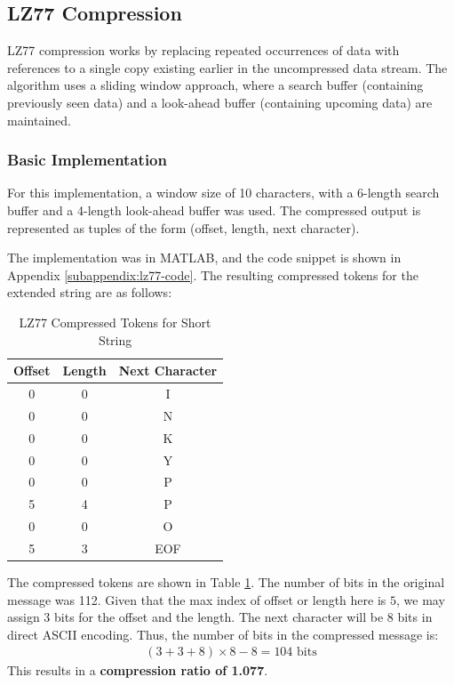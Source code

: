 \documentclass[12pt, a4paper]{AnantDocumentation}
\begin{document}
\subsection{LZ77 Compression}
\label{subsec:lz77}
LZ77 compression works by replacing repeated occurrences of data with references to a single copy existing earlier in the uncompressed data stream. The algorithm uses a sliding window approach, where a search buffer (containing previously seen data) and a look-ahead buffer (containing upcoming data) are maintained.

\subsubsection{Basic Implementation}
\label{subsubsec:lz77-basic}
For this implementation, a window size of 10 characters, with a 6-length search buffer and a 4-length look-ahead buffer was used. The compressed output is represented as tuples of the form (offset, length, next character).

The implementation was in MATLAB, and the code snippet is shown in Appendix \ref{subappendix:lz77-code}. The resulting compressed tokens for the extended string are as follows:
\begin{table}[h!]
	\centering
	\begin{tabular}{ccc}
		\toprule
		Offset & Length & Next Character \\
		\midrule
		0 & 0 & I \\
		0 & 0 & N \\
		0 & 0 & K \\
		0 & 0 & Y \\
		0 & 0 & P \\
		5 & 4 & P \\
		0 & 0 & O \\
		5 & 3 & EOF \\
		\bottomrule
	\end{tabular}
	\caption{LZ77 Compressed Tokens for Short String}
	\label{tab:lz77-tokens}
\end{table}
The compressed tokens are shown in Table \ref{tab:lz77-tokens}. The number of bits in the original message was 112. Given that the max index of offset or length here is $5$, we may assign 3 bits for the offset and the length. 
The next character will be 8 bits in direct ASCII encoding. Thus, the number of bits in the compressed message is:
\begin{align}
	(3 + 3 + 8) \times 8 - 8 = 104 \text{ bits}
\end{align}
This results in a \textbf{compression ratio of 1.077}.
\end{document}
